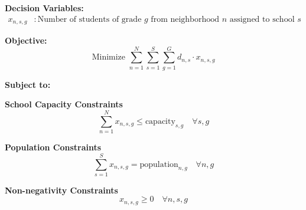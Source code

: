 \documentclass{article}
\begin{document}
\textbf{Decision Variables:}
\begin{align*}
x_{n,s,g} & : \text{Number of students of grade } g \text{ from neighborhood } n \text{ assigned to school } s
\end{align*}

\textbf{Objective:}
\[
\text{Minimize } \sum_{n=1}^{N} \sum_{s=1}^{S} \sum_{g=1}^{G} d_{n,s} \cdot x_{n,s,g}
\]

\textbf{Subject to:}

\textbf{School Capacity Constraints}
\[
\sum_{n=1}^{N} x_{n,s,g} \leq \text{capacity}_{s,g} \quad \forall s, g
\]

\textbf{Population Constraints}
\[
\sum_{s=1}^{S} x_{n,s,g} = \text{population}_{n,g} \quad \forall n, g
\]

\textbf{Non-negativity Constraints}
\[
x_{n,s,g} \geq 0 \quad \forall n, s, g
\]
\end{document}
